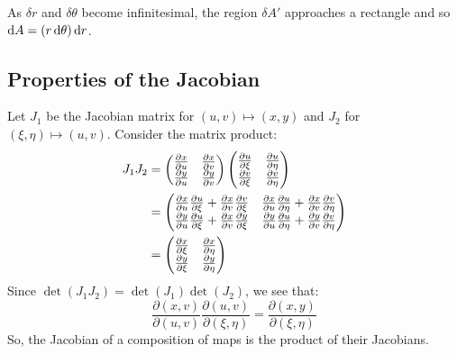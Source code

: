 \documentclass[../main.tex]{subfiles}
\begin{document}
\begin{example}
\begin{center}
  \end{center}
  As $\delta r$ and $\delta \theta$ become infinitesimal, the region $\delta A'$ approaches a rectangle and so $\d{A} = (r \d{\theta}) \d{r}$.
\end{example}
\subsection{Properties of the Jacobian}
Let $J_1$ be the Jacobian matrix for $(u, v) \mapsto (x, y)$ and $J_2$ for $(\xi, \eta) \mapsto (u, v)$.
Consider the matrix product:
\begin{align*}
  J_1 J_2 &= \begin{pmatrix}
  \pderiv{x}{u} & \pderiv{x}{v} \\
  \pderiv{y}{u} & \pderiv{y}{v} \\
  \end{pmatrix}
  \begin{pmatrix}
  \pderiv{u}{\xi} & \pderiv{u}{\eta} \\
  \pderiv{v}{\xi} & \pderiv{v}{\eta} \\
  \end{pmatrix} \\
  &= \begin{pmatrix}
  \pderiv{x}{u} \pderiv{u}{\xi} + \pderiv{x}{v} \pderiv{v}{\xi} & \pderiv{x}{u} \pderiv{u}{\eta} + \pderiv{x}{v} \pderiv{v}{\eta} \\
  \pderiv{y}{u} \pderiv{u}{\xi} + \pderiv{x}{v} \pderiv{y}{\xi} & \pderiv{y}{u} \pderiv{u}{\eta} + \pderiv{y}{v} \pderiv{v}{\eta} \\
  \end{pmatrix} \\
  &= \begin{pmatrix}
  \pderiv{x}{\xi} & \pderiv{x}{\eta} \\
  \pderiv{y}{\xi} & \pderiv{y}{\eta} \\
  \end{pmatrix}
\end{align*}
Since $\det(J_1 J_2) = \det(J_1)\det(J_2)$, we see that:
\[
  \frac{\partial(x, v)}{\partial(u, v)} \frac{\partial(u, v)}{\partial(\xi, \eta)} = \frac{\partial(x, y)}{\partial(\xi, \eta)}
\]
So, the Jacobian of a composition of maps is the product of their Jacobians.
\end{document}
